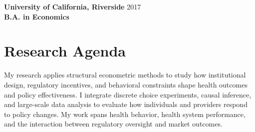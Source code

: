 \documentclass[11pt, letterpaper]{article}
\begin{document}
\vspace{0.5em}
\noindent \textbf{University of California, Riverside} \hfill 2017 \\
\textbf{B.A. in Economics}

\section*{Research Agenda}
My research applies structural econometric methods to study how institutional design, regulatory incentives, and behavioral constraints shape health outcomes and policy effectiveness. I integrate discrete choice experiments, causal inference, and large-scale data analysis to evaluate how individuals and providers respond to policy changes. My work spans health behavior, health system performance, and the interaction between regulatory oversight and market outcomes.
\end{document}
